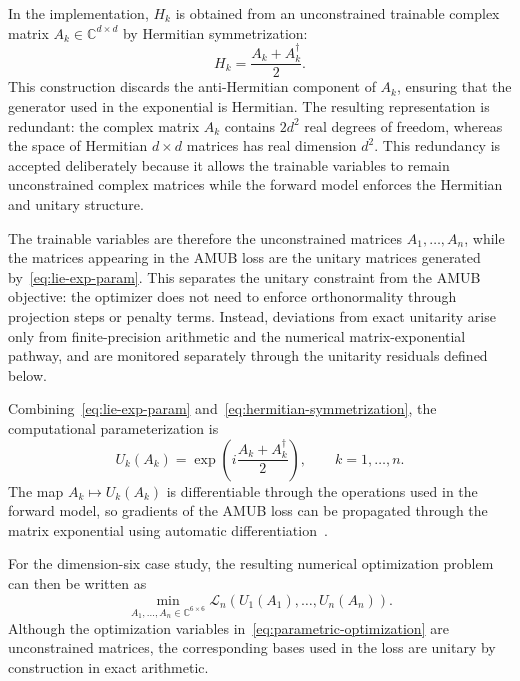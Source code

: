 \documentclass[a4paper,twocolumn,11pt,amsfonts,amssymb]{quantumarticle}
\begin{document}
In the implementation, $H_k$ is obtained from an unconstrained trainable complex matrix $A_k \in \mathbb{C}^{d \times d}$ by Hermitian symmetrization:
\begin{equation}
    H_k
    =
    \frac{A_k + A_k^\dagger}{2}.
    \label{eq:hermitian-symmetrization}
\end{equation}
This construction discards the anti-Hermitian component of \(A_k\), ensuring that the generator used in the exponential is Hermitian. The resulting representation is redundant: the complex matrix \(A_k\) contains \(2d^2\) real degrees of freedom, whereas the space of Hermitian \(d\times d\) matrices has real dimension \(d^2\). This redundancy is accepted deliberately because it allows the trainable variables to remain unconstrained complex matrices while the forward model enforces the Hermitian and unitary structure.

The trainable variables are therefore the unconstrained matrices \(A_1,\ldots,A_n\), while the matrices appearing in the AMUB loss are the unitary matrices generated by~\eqref{eq:lie-exp-param}. This separates the unitary constraint from the AMUB objective: the optimizer does not need to enforce orthonormality through projection steps or penalty terms. Instead, deviations from exact unitarity arise only from finite-precision arithmetic and the numerical matrix-exponential pathway, and are monitored separately through the unitarity residuals defined below.

Combining~\eqref{eq:lie-exp-param} and~\eqref{eq:hermitian-symmetrization}, the computational parameterization is
\begin{equation}
    U_k(A_k)
    =
    \exp\left(
    i\frac{A_k + A_k^\dagger}{2}
    \right),
    \qquad
    k=1,\ldots,n.
    \label{eq:computational-param}
\end{equation}
The map $A_k \mapsto U_k(A_k)$ is differentiable through the operations used in the forward model, so gradients of the AMUB loss can be propagated through the matrix exponential using automatic differentiation~\cite{Paszke2017AutomaticDI}.


For the dimension-six case study, the resulting numerical optimization problem can then be written as
\begin{equation}
    \min_{A_1,\ldots,A_n \in \mathbb{C}^{6 \times 6}}
    \mathcal{L}_n
    \left(
    U_1(A_1),\ldots,U_n(A_n)
    \right).
    \label{eq:parametric-optimization}
\end{equation}
Although the optimization variables in~\eqref{eq:parametric-optimization} are unconstrained matrices, the corresponding bases used in the loss are unitary by construction in exact arithmetic.
\end{document}
